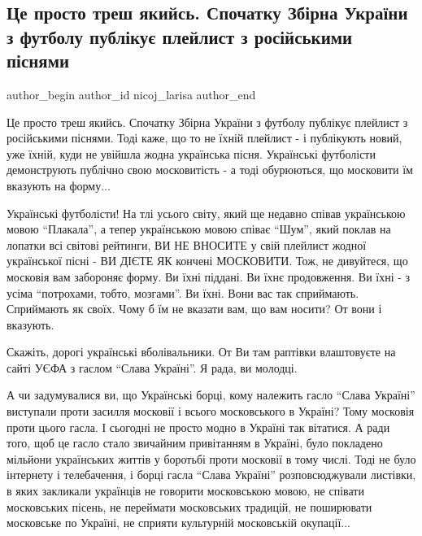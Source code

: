  
 
 
 
 
 
\subsection{Це просто треш якийсь. Спочатку Збірна України з футболу публікує плейлист з російськими піснями}
\label{sec:11_06_2021.fb.nicoj_larisa.1.ukraina_sbornaja_mova_jazyk}
\ifcmt
 author_begin
   author_id nicoj_larisa
 author_end
\fi

Це просто треш якийсь. Спочатку Збірна України з футболу публікує плейлист з
російськими піснями. Тоді каже, що то не їхній плейлист - і публікують новий,
уже їхній, куди не увійшла жодна українська пісня. Українські футболісти
демонструють публічно свою московитість - а тоді обурюються, що московити їм
вказують на форму... 

Українські футболісти! На тлі усього світу, який ще недавно співав українською
мовою \enquote{Плакала}, а тепер українською мовою співає \enquote{Шум}, який поклав на лопатки
всі світові рейтинги, ВИ НЕ ВНОСИТЕ у свій плейлист жодної української пісні -
ВИ ДІЄТЕ ЯК кончені МОСКОВИТИ. Тож, не дивуйтеся, що московія вам забороняє
форму. Ви їхні піддані. Ви їхнє продовження. Ви їхні - з усіма \enquote{потрохами,
тобто, мозгами}. Ви їхні. Вони вас так сприймають. Сприймають як своїх. Чому б
їм не вказати вам, що вам носити? От вони і вказують. 

Скажіть, дорогі українські вболівальники. От Ви там раптівки влаштовуєте на
сайті УЄФА з гаслом \enquote{Слава Україні}. Я рада, ви молодці. 

А чи задумувалися ви, що Українські борці, кому належить гасло \enquote{Слава
Україні} виступали проти засилля московії і всього московського в Україні? Тому
московія проти цього гасла. І сьогодні не просто модно в Україні так вітатися.
А ради того, щоб це гасло стало звичайним привітанням в Україні, було покладено
мільйони українських життів у боротьбі проти московії в тому числі. Тоді не
було інтернету і телебачення, і борці гасла \enquote{Слава Україні}
розповсюджували листівки, в яких закликали українців не говорити московською
мовою, не співати московських пісень, не переймати московських традицій, не
поширювати московське по Україні, не сприяти культурній московській окупації...

